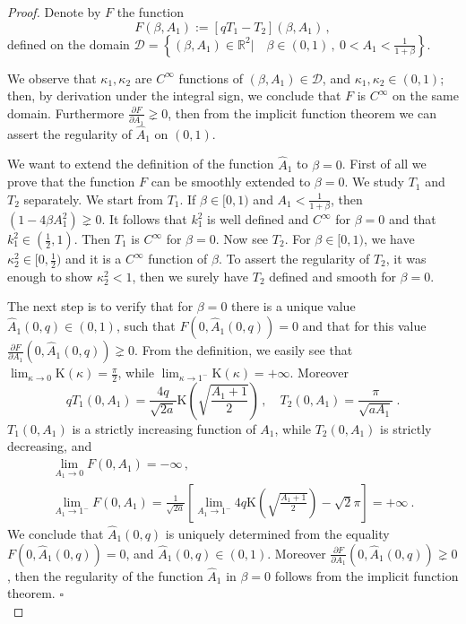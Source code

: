 \documentclass[a4paper]{article}
\begin{document}
\begin{proof}
Denote by $F$ the function
\[
F(\beta, A_1):= [qT_1-T_2](\beta, A_1)\,,
\]
defined on the domain $\mathcal{D}=\left\{(\beta,A_1) \in {\mathbb{R}}^2| \quad
\beta \in (0,1)\,, \ 0<A_1<\frac{1}{1+\beta} \right\}$.

We observe that $\kappa_1, \kappa_2$ are $C^{\infty}$ functions of
$(\beta, A_1) \in \mathcal{D}$, and $\kappa_1,\kappa_2 \in (0,1)$;
then, by derivation under the integral sign, we conclude that $F$ is
$C^{\infty}$ on the same domain.  Furthermore $\frac{\partial
  F}{\partial A_1}\gneq 0$, then from the implicit function theorem we
can assert the regularity of $\hat{A}_1$ on $(0,1)$.

We want to extend the definition of the function $\hat{A}_1$ to
$\beta=0$.  First of all we prove that the function $F$ can be
smoothly extended to $\beta=0$.  We study $T_1$ and $T_2$ separately.
We start from $T_1$. If $\beta \in [0,1)$ and $A_1<\frac{1}{1+\beta}$,
  then $(1-4\beta A_1^2) \gneq 0$. It follows that $k_1^2$ is well
  defined and $C^{\infty}$ for $\beta =0$ and that $k_1^2 \in
  (\frac{1}{2},1)$. Then $T_1$ is $C^{\infty}$ for $\beta =0$.  Now
  see $T_2$. For $\beta \in [0,1)$, we have $\kappa_2^2 \in
    [0,\frac{1}{2})$ and it is a $C^{\infty}$ function of $\beta$.  To
      assert the regularity of $T_2$, it was enough to show
      $\kappa_2^2 < 1$, then we surely have $T_2$ defined and smooth
      for $\beta =0$.
        
The next step is to verify that for $\beta =0$ there is a unique value
$\hat{A}_1(0,q) \in (0, 1)$, such that $F(0,\hat{A}_1(0,q))=0$ and that
for this value $\frac{\partial F}{\partial A_1}(0,\hat{A}_1(0,q))\gneq
0$.  From the definition, we easily see that $\lim_{\kappa \rightarrow
  0}{\mathrm{K}}(\kappa)=\frac{\pi}{2}$, while $\lim_{\kappa \rightarrow
  1^-}{\mathrm{K}}(\kappa)=+\infty$. Moreover
\[
qT_1(0,A_1)= \frac{4q}{\sqrt{2a}} {\mathrm{K}}(\sqrt{\frac{A_1+1}{2}}) \,, \quad
T_2(0,A_1)= \frac{\pi}{\sqrt{a A_1}}\ .
\] 
$T_1(0,A_1)$ is a strictly increasing function of $A_1$, while
$T_2(0,A_1)$ is strictly decreasing, and
\[
\begin{array}{c}
\lim_{A_1\rightarrow 0} F(0,A_1)=-\infty \,, 
\\ 
\lim_{A_1 \rightarrow  1^-}F(0,A_1)=
\frac{1}{\sqrt{2a}} \left[\lim_{A_1 \rightarrow 1^-}
4q{\mathrm{K}}(\sqrt{\frac{A_1+1}{2}})- \sqrt{2}\pi\right] 
= +\infty \ .
\end{array}
\]
We conclude that $\hat{A}_1(0,q)$ is uniquely determined from the
equality $F(0,\hat{A}_1(0,q))=0$, and $\hat{A}_1(0,q) \in
(0,1)$. Moreover $\frac{\partial F}{\partial A_1}(0,\hat{A}_1(0,q))
\gneq 0$, then the regularity of the function $\hat{A}_1$ in $\beta
=0$ follows from the implicit function theorem.  {$\square$\\}
\end{proof}
\end{document}
